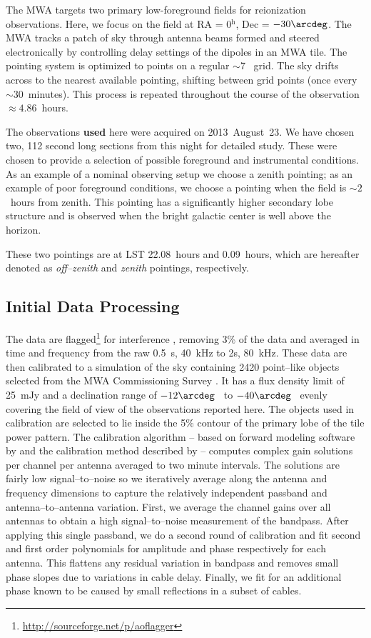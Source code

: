 \documentclass[preprint2,iop,numberedappendix,twocolappendix,appendixfloats]{emulateapj}
\begin{document}
The MWA targets two primary low-foreground fields for reionization observations. Here, we focus on the field at RA = 0$^\textrm{h}$, Dec = $-30\arcdeg$. The MWA tracks a patch of sky through antenna beams formed and steered electronically by controlling delay settings of the dipoles in an MWA tile. The pointing system is optimized to points on a regular $\sim$7\arcdeg~ grid. The sky drifts across to the nearest available pointing, shifting between grid points (once every $\sim 30$~minutes). This process is repeated throughout the course of the observation $\approx 4.86$~hours. 

The observations {\bf used} here were acquired on 2013~August~23. We have chosen two, 112 second long sections from this night for detailed study. These were chosen to provide a selection of possible foreground and instrumental conditions. As an example of a nominal observing setup we choose a zenith pointing; as an example of poor foreground conditions, we choose a pointing when the field is $\sim 2$~hours from zenith. This pointing has a significantly higher secondary lobe structure and is observed when the bright galactic center is well above the horizon. 

These two pointings are at LST 22.08~hours and 0.09~hours, which are hereafter denoted as {\it off--zenith} and {\it zenith} pointings, respectively. 

\subsection{Initial Data Processing}\label{sec:data-analysis}

The data are flagged\footnote{\url{http://sourceforge.net/p/aoflagger}} for interference \citep{off10,off12}, removing 3\% of the data and averaged in time  and frequency from the raw 0.5~s, 40~kHz to 2s, 80~kHz. These data are then calibrated to a simulation of the sky containing 2420 point--like objects selected from the MWA Commissioning Survey \citep[MWACS;][]{hur14}. It has a flux density limit of 25~mJy and a declination range of $-12\arcdeg$~ to $-40\arcdeg$~ evenly covering the field of view of the observations reported here. The objects used in calibration are selected to lie inside the 5\% contour of the primary lobe of the tile power pattern. The calibration algorithm -- based on forward modeling software by \citet{sul12} and the calibration method described by \citet{sal14} -- computes complex gain solutions per channel per antenna averaged to two minute intervals. The solutions are fairly low signal--to--noise so we iteratively average along the antenna and frequency dimensions to capture the relatively independent passband and antenna--to--antenna variation. First, we average the channel gains over all antennas to obtain a high signal--to--noise measurement of the bandpass. After applying this single passband, we do a second round of calibration and fit second and first order polynomials for amplitude and phase respectively for each antenna. This flattens any residual variation in bandpass and removes small phase slopes due to variations in cable delay. Finally, we fit for an additional phase known to be caused by small reflections in a subset of cables. 
\end{document}
